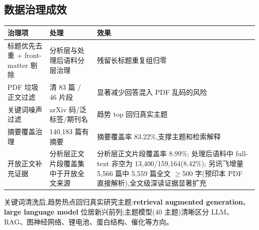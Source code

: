 \subsection{数据治理成效}
\begin{tableblock}
\begin{tabularx}{0.94\textwidth}{p{34mm}p{48mm}X}
\toprule
\textbf{治理项} & \textbf{处理} & \textbf{效果} \\
\midrule
标题优先去重 + front-matter 剔除 & 分析层与处理后语料分层治理 & 残留长标题重复组归零 \\
PDF 垃圾正文过滤 & 清 83 篇 / 46 片段 & 显著减少回答混入 PDF 乱码的风险 \\
关键词噪声过滤 & arXiv 码/泛标签/期刊名 & 趋势 top 回归真实主题 \\
摘要覆盖治理 & 140{,}183 篇有摘要 & 摘要覆盖率 83.22\%,支撑主题和检索解释 \\
开放正文补充证据 & 分析层正文片段覆盖集中于开放全文来源 & 分析层正文片段覆盖率 8.99\%; 处理后语料中 full-text 非空为 13{,}400/159{,}164(8.42\%); 另讯飞增量 5{,}566 篇中 5{,}559 篇全文 $\geq$500 字(预印本 PDF 直接解析),全文级深读证据显著扩充 \\
\bottomrule
\end{tabularx}
\end{tableblock}
关键词清洗后,趋势热点回归真实研究主题:\textbf{retrieval augmented generation}、\textbf{large language model} 位居新兴前列;主题模型(40 主题)清晰区分 LLM、RAG、图神经网络、锂电池、蛋白结构、催化等方向。

